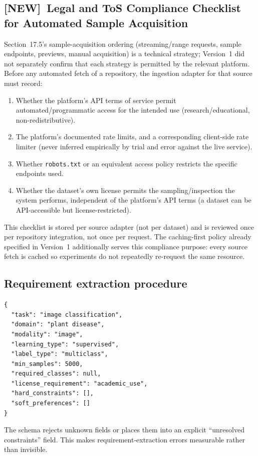 \documentclass[11pt]{article}
\newcommand{\newtag}{\textcolor{accent}{\textbf{[NEW]}}\ }
\begin{document}
\subsection{\newtag Legal and ToS Compliance Checklist for Automated Sample Acquisition}
\label{sec:legal}
Section~17.5's sample-acquisition ordering (streaming/range requests, sample endpoints, previews, manual
acquisition) is a technical strategy; Version~1 did not separately confirm that each strategy is
permitted by the relevant platform. Before any automated fetch of a repository, the ingestion adapter for
that source must record:
\begin{enumerate}[leftmargin=*]
\item Whether the platform's API terms of service permit automated/programmatic access for the intended
      use (research/educational, non-redistributive).
\item The platform's documented rate limits, and a corresponding client-side rate limiter (never inferred
      empirically by trial and error against the live service).
\item Whether \texttt{robots.txt} or an equivalent access policy restricts the specific endpoints used.
\item Whether the dataset's own license permits the sampling/inspection the system performs, independent
      of the platform's API terms (a dataset can be API-accessible but license-restricted).
\end{enumerate}
This checklist is stored per source adapter (not per dataset) and is reviewed once per repository
integration, not once per request. The caching-first policy already specified in Version~1 additionally
serves this compliance purpose: every source fetch is cached so experiments do not repeatedly re-request
the same resource.

\subsection{Requirement extraction procedure}
\begin{lstlisting}[basicstyle=\ttfamily\footnotesize]
{
  "task": "image classification",
  "domain": "plant disease",
  "modality": "image",
  "learning_type": "supervised",
  "label_type": "multiclass",
  "min_samples": 5000,
  "required_classes": null,
  "license_requirement": "academic_use",
  "hard_constraints": [],
  "soft_preferences": []
}
\end{lstlisting}
The schema rejects unknown fields or places them into an explicit ``unresolved constraints'' field. This
makes requirement-extraction errors measurable rather than invisible.
\end{document}
